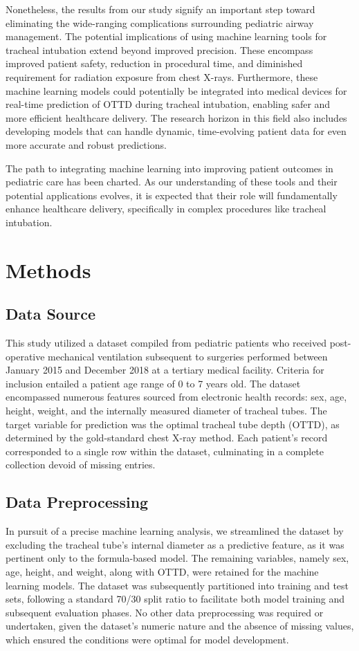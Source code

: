 \documentclass[11pt]{article}
\begin{document}
Nonetheless, the results from our study signify an important step toward eliminating the wide-ranging complications surrounding pediatric airway management. The potential implications of using machine learning tools for tracheal intubation extend beyond improved precision. These encompass improved patient safety, reduction in procedural time, and diminished requirement for radiation exposure from chest X-rays. Furthermore, these machine learning models could potentially be integrated into medical devices for real-time prediction of OTTD during tracheal intubation, enabling safer and more efficient healthcare delivery. The research horizon in this field also includes developing models that can handle dynamic, time-evolving patient data for even more accurate and robust predictions.

The path to integrating machine learning into improving patient outcomes in pediatric care has been charted. As our understanding of these tools and their potential applications evolves, it is expected that their role will fundamentally enhance healthcare delivery, specifically in complex procedures like tracheal intubation.

\section*{Methods}

\subsection*{Data Source}
This study utilized a dataset compiled from pediatric patients who received post-operative mechanical ventilation subsequent to surgeries performed between January 2015 and December 2018 at a tertiary medical facility. Criteria for inclusion entailed a patient age range of 0 to 7 years old. The dataset encompassed numerous features sourced from electronic health records: sex, age, height, weight, and the internally measured diameter of tracheal tubes. The target variable for prediction was the optimal tracheal tube depth (OTTD), as determined by the gold-standard chest X-ray method. Each patient's record corresponded to a single row within the dataset, culminating in a complete collection devoid of missing entries.

\subsection*{Data Preprocessing}
In pursuit of a precise machine learning analysis, we streamlined the dataset by excluding the tracheal tube's internal diameter as a predictive feature, as it was pertinent only to the formula-based model. The remaining variables, namely sex, age, height, and weight, along with OTTD, were retained for the machine learning models. The dataset was subsequently partitioned into training and test sets, following a standard 70/30 split ratio to facilitate both model training and subsequent evaluation phases. No other data preprocessing was required or undertaken, given the dataset's numeric nature and the absence of missing values, which ensured the conditions were optimal for model development.
\end{document}
